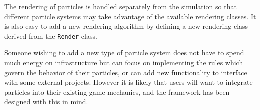 The rendering of particles is handled separately from the simulation so that
different particle systems may take advantage of the available rendering
classes. It is also easy to add a new rendering algorithm by defining a new
rendering class derived from the \verb|Render| class.


Someone wishing to add a new type of particle system does not have to spend
much energy on infrastructure but can focus on implementing the rules
which govern the behavior of their particles, or can add new functionality to
interface with some external projects. However it is likely that users will want to
integrate particles into their existing game mechanics, and the framework has
been designed with this in mind.



